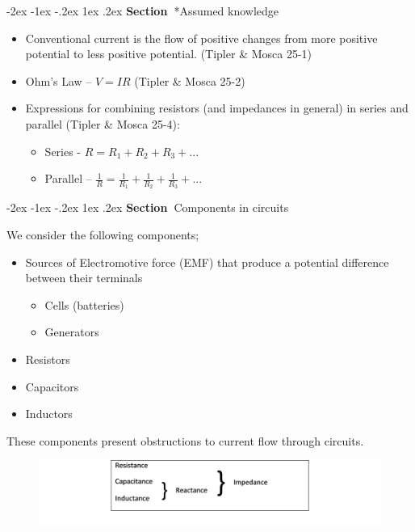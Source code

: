 \documentclass[
]{book}
\makeatletter
\renewcommand\section{%
\@startsection{section}{1}{\z@}%
              {-2ex \@plus -1ex \@minus -.2ex}%
              {1ex \@plus .2ex}%
              {\sffamily\bfseries\large\noindent Section~}}
\numberwithin{equation}{section}
\makeatother
\begin{document}
\hypertarget{assumed-knowledge}{%
\section*{Assumed knowledge}\label{assumed-knowledge}}

\begin{itemize}
\item
  Conventional current is the flow of positive changes from more
  positive potential to less positive potential. (Tipler \& Mosca 25-1)
\item
  Ohm's Law -- \(V = IR\) (Tipler \& Mosca 25-2)
\item
  Expressions for combining resistors (and impedances in general) in
  series and parallel (Tipler \& Mosca 25-4):

  \begin{itemize}
  \item
    Series - \(R = R_1 + R_2+ R_3 + ...\)
  \item
    Parallel --
    \(\frac{1}{R} = \frac{1}{R_1} + \frac{1}{R_2} + \frac{1}{R_3} + ...\)
  \end{itemize}
\end{itemize}

\hypertarget{components-in-circuits}{%
\section{Components in circuits}\label{components-in-circuits}}

We consider the following components;

\begin{itemize}
\item
  Sources of Electromotive force (EMF) that produce a potential
  difference between their terminals

  \begin{itemize}
  \item
    Cells (batteries)
  \item
    Generators
  \end{itemize}
\item
  Resistors
\item
  Capacitors
\item
  Inductors
\end{itemize}

These components present obstructions to current flow through circuits.

\begin{figure}

{\centering \includegraphics[width=0.7\linewidth]{Figures/ances_summary} 

}

\end{figure}
\end{document}
